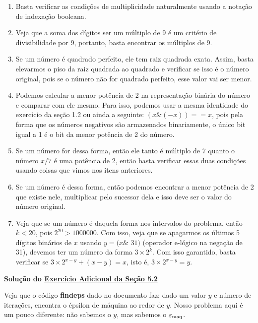 \documentclass[11pt, a4paper]{article}
\begin{document}
\begin{enumerate}
    \item Basta verificar as condições de multiplicidade naturalmente usando a notação de indexação booleana.

    \item Veja que a soma dos dígitos ser um múltiplo de 9 é um critério de divisibilidade por 9, portanto, basta encontrar os múltiplos de 9.

    \item Se um número é quadrado perfeito, ele tem raiz quadrada exata. Assim, basta elevarmos o piso da raiz quadrada ao quadrado e verificar se isso é o número original, pois se o número não for quadrado perfeito, esse valor vai ser menor.

    \item Podemos calcular a menor potência de 2 na representação binária do número e comparar com ele mesmo. Para isso, podemos usar a mesma identidade do exercício da seção 1.2 ou ainda a seguinte: \((x\&(-x)) == x\), pois pela forma que os números negativos são armazenados binariamente, o único bit igual a 1 é o bit da menor potência de 2 do número.

    \item Se um número for dessa forma, então ele tanto é múltiplo de 7 quanto o número \(x/7\) é uma potência de 2, então basta verificar essas duas condições usando coisas que vimos nos itens anteriores.

    \item Se um número é dessa forma, então podemos encontrar a menor potência de 2 que existe nele, multiplicar pelo sucessor dela e isso deve ser o valor do número original.

    \item Veja que se um número é daquela forma nos intervalos do problema, então \(k<20\), pois \(2^{20}>1000000\). Com isso, veja que se apagarmos os últimos 5 dígitos binários de \(x\) usando \(y=(x \&\) \til \(31)\) (operador e-lógico na negação de 31), devemos ter um número da forma \(3\times 2^k\). Com isso garantido, basta verificar se \(3\times2^{x-y}+(x-y)=x\), isto é, \(3\times2^{x-y}=y\). 
\end{enumerate}

\newpage

\label{sol_ex5.2.a}
\textbf{Solução do \hyperref[ex5.2.a]{Exercício Adicional da Seção 5.2}}

Veja que o código \textbf{findeps} dado no documento faz: dado um valor \(y\) e número de iterações, encontra o épsilon de máquina ao redor de \(y\). Nosso problema aqui é um pouco diferente: não sabemos o \(y\), mas sabemos o \(\varepsilon_{\text{maq}}\).
\end{document}
